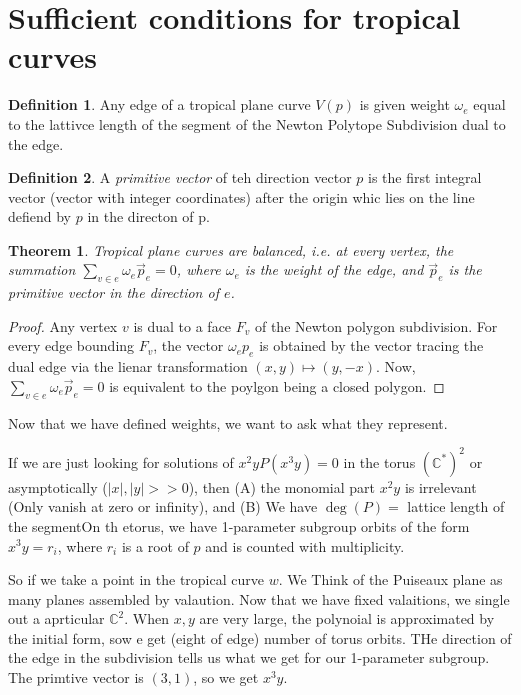 \documentclass[11pt]{article}
\newtheorem{prototheorem}{Theorem}[section]
\newenvironment{theorem}
   {\begin{prototheorem}}
   {\end{prototheorem}}
\theoremstyle{definition}
\newtheorem{protodefinition}{Definition}[section]
\newenvironment{define}
   {\begin{protodefinition}}
   {\end{protodefinition}}
\def\CC{{\mathbb C}}
\begin{document}
\section{Sufficient conditions for tropical curves}

\begin{define}
    Any edge of a tropical plane curve $V(p)$ is given weight $\omega_e$ equal to the lattivce length of the segment of the Newton Polytope Subdivision dual to the edge.
\end{define}

\begin{define}
    A \emph{primitive vector} of teh direction vector $p$ is the first integral vector (vector with integer coordinates) after the origin whic lies on the line defiend by $p$ in the directon of p.
\end{define}


\begin{theorem}
    Tropical plane curves are balanced, i.e. at every vertex, the summation $\sum\limits_{v \in e}\omega_e \overrightarrow{p}_e=0$, where $\omega_e$ is the weight of the edge, and $\overrightarrow{p}_e$ is the primitive vector in the direction of $e$.
\end{theorem}

\begin{proof}
    Any vertex $v$ is dual to a face $F_v$ of the Newton polygon subdivision. For every edge bounding $F_v$, the vector $\omega_e p_e$ is obtained by the vector tracing the dual edge via the lienar transformation $(x,y)\mapsto (y,-x)$. Now,  $\sum\limits_{v \in e}\omega_e \overrightarrow{p}_e=0$ is equivalent to the poylgon being a closed polygon.
\end{proof}


Now that we have defined weights, we want to ask what they represent.


If we are just looking for solutions of $x^2yP(x^3y)=0$ in the torus $(\CC^*)^2$ or asymptotically ($|x|,|y|>>0$), then (A) the monomial part $x^2y$ is irrelevant (Only vanish at zero or infinity), and (B) We have $\deg(P) =$ lattice length of the segmentOn th etorus, we have 1-parameter subgroup orbits of the form $x^3y=r_i$, where $r_i$ is a root of $p$ and is counted with multiplicity.


So if we take a point in the tropical curve $w$. We Think of the Puiseaux plane as many planes assembled by valaution. Now that we have fixed valaitions, we single out a aprticular $\CC^2$. When $x,y$ are very large, the polynoial is approximated by the initial form, sow e get (eight of edge) number of torus orbits. THe direction of the edge in the subdivision tells us what we get for our 1-parameter subgroup. The primtive vector is $(3,1)$, so we get $x^3y$.
\end{document}
